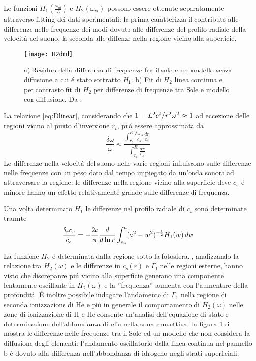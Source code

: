{Le funzioni $H_1(\frac{\omega_{nl}}{L})$ e $H_2(\omega_{nl})$ possono essere ottenute separatamente attraverso fitting dei dati sperimentali: la prima caratterizza il contributo alle differenze nelle frequenze dei modi dovuto alle differenze del profilo radiale della velocit\'a del suono, la seconda alle diffenze nella regione vicino alla superficie.

\begin{figure}[!ht]
        \texttt{[image: H2dnd]}
        \caption{a) Residuo della differenza di frequenze fra il sole e un modello senza diffusione a cui \'e stato sottratto $H_1$. b) Fit di $H_2$ linea continua e per contrasto fit di $H_2$ per differenze di frequenze tra Sole e modello con diffusione. Da \cite{dal03notes}.}\label{fig:H2dnd}
\end{figure}

La relazione \eqref{eq:Dlinear}, considerando che $1-\left.{L^2c^2}\middle/{r^2\omega^2}\right.\approx1$ ad eccezione delle regioni vicino al punto d'inversione $r_t$, pu\'o essere approssimata da
\begin{equation}
\frac{\delta\omega}{\omega}\approx\frac{\int_{r_t}^{R}\frac{\delta_rc_s}{c_s}\frac{dr}{c_s}}{\int_{r_t}^R\frac{dr}{c_s}}
\end{equation}
Le differenze nella velocit\'a del suono nelle varie regioni influiscono sulle differenze nelle frequenze con un peso dato dal tempo impiegato da un'onda sonora ad attraversare la regione: le differenze nella regione vicino alla superficie dove $c_s$ \'e minore hanno un effetto relativamente grande sulle differenze di frequenza.

Una volta determinato $H_1$ le differenze nel profilo radiale di $c_s$ sono determinate tramite
\begin{equation}
\frac{\delta_rc_s}{c_s}=-\frac{2a}{\pi}\frac{d}{d \ln{r}}\int_{a_s}^a(a^2-w^2)^{-\frac{1}{2}}H_1(w)\,dw
\end{equation}


La funzione $H_2$ \'e determinata dalla regione sotto la fotosfera. \cite{chr92phase}, analizzando la relazione tra $H_2(\omega)$ e le differenze in $c_s(r)$ e $\Gamma_1$ nelle regioni esterne, hanno visto che discrepanze pi\'u vicino alla superficie generano una componente lentamente oscillante in $H_2(\omega)$ e la ''frequenza'' aumenta con l'aumentare della profondit\'a. \'E inoltre possibile indagare l'andamento di $\Gamma_1$ nella regione di seconda ionizzazione di He e pi\'u in generale il comportamento di $H_2(\omega)$ nelle zone di ionizzazione di H e He consente un'analisi dell'equazione di stato e determinazione dell'abbondanza di elio nella zona convettiva. In figura \ref{fig:H2dnd} si mostra le differenze nelle frequenze tra il Sole ed un modello che non considera la diffusione degli elementi: l'andamento oscillatorio della linea continua nel pannello b \'e dovuto alla differenza nell'abbondanza di idrogeno negli strati superficiali.


}
